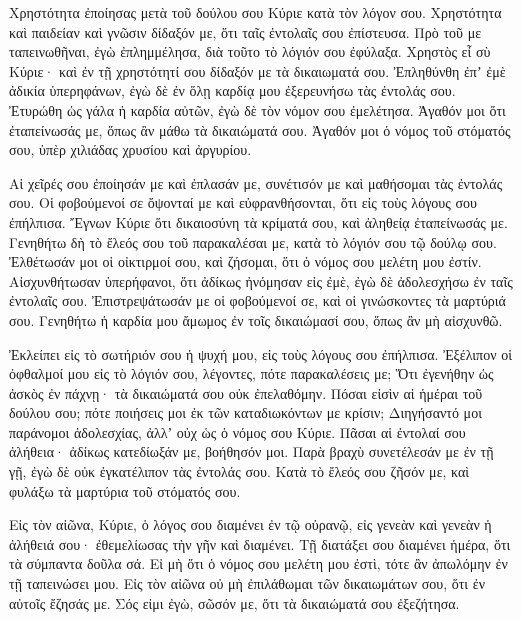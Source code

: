 {\par }{\PP {}Χρηστότητα ἐποίησας μετὰ τοῦ δούλου σου Κύριε κατὰ τὸν λόγον σου.
Χρηστότητα καὶ παιδείαν καὶ γνῶσιν δίδαξόν με, ὅτι ταῖς ἐντολαῖς σου ἐπίστευσα.
Πρὸ τοῦ με ταπεινωθῆναι, ἐγὼ ἐπλημμέλησα, διὰ τοῦτο τὸ λόγιόν σου ἐφύλαξα.
Χρηστὸς εἶ σὺ Κύριε· καὶ ἐν τῇ χρηστότητί σου δίδαξόν με τὰ δικαιωματά σου.
Ἐπληθύνθη ἐπʼ ἐμὲ ἀδικία ὑπερηφάνων, ἐγὼ δὲ ἐν ὅλῃ καρδίᾳ μου ἐξερευνήσω τὰς ἐντολάς σου.
Ἐτυρώθη ὡς γάλα ἡ καρδία αὐτῶν, ἐγὼ δὲ τὸν νόμον σου ἐμελέτησα.
Ἀγαθόν μοι ὅτι ἐταπείνωσάς με, ὅπως ἂν μάθω τὰ δικαιώματά σου.
Ἀγαθόν μοι ὁ νόμος τοῦ στόματός σου, ὑπὲρ χιλιάδας χρυσίου καὶ ἀργυρίου.
\par }{\PP {}Αἱ χεῖρές σου ἐποίησάν με καὶ ἐπλασάν με, συνέτισόν με καὶ μαθήσομαι τὰς ἐντολάς σου.
Οἱ φοβούμενοί σε ὄψονταί με καὶ εὐφρανθήσονται, ὅτι εἰς τοὺς λόγους σου ἐπήλπισα.
Ἔγνων Κύριε ὅτι δικαιοσύνη τὰ κρίματά σου, καὶ ἀληθείᾳ ἐταπείνωσάς με.
Γενηθήτω δὴ τὸ ἔλεός σου τοῦ παρακαλέσαι με, κατὰ τὸ λόγιόν σου τῷ δούλῳ σου.
Ἐλθέτωσάν μοι οἱ οἰκτιρμοί σου, καὶ ζήσομαι, ὅτι ὁ νόμος σου μελέτη μου ἐστίν.
Αἰσχυνθήτωσαν ὑπερήφανοι, ὅτι ἀδίκως ἠνόμησαν εἰς ἐμὲ, ἐγὼ δὲ ἀδολεσχήσω ἐν ταῖς ἐντολαῖς σου.
Ἐπιστρεψάτωσάν με οἱ φοβούμενοί σε, καὶ οἱ γινώσκοντες τὰ μαρτύριά σου.
Γενηθήτω ἡ καρδία μου ἄμωμος ἐν τοῖς δικαιώμασί σου, ὅπως ἂν μὴ αἰσχυνθῶ.
\par }{\PP {}Ἐκλείπει εἰς τὸ σωτήριόν σου ἡ ψυχή μου, εἰς τοὺς λόγους σου ἐπήλπισα.
Ἐξέλιπον οἱ ὀφθαλμοί μου εἰς τὸ λόγιόν σου, λέγοντες, πότε παρακαλέσεις με;
Ὅτι ἐγενήθην ὡς ἀσκὸς ἐν πάχνῃ· τὰ δικαιώματά σου οὐκ ἐπελαθόμην.
Πόσαι εἰσὶν αἱ ἡμέραι τοῦ δούλου σου; πότε ποιήσεις μοι ἐκ τῶν καταδιωκόντων με κρίσιν;
Διηγήσαντό μοι παράνομοι ἀδολεσχίας, ἀλλʼ οὐχ ὡς ὁ νόμος σου Κύριε.
Πᾶσαι αἱ ἐντολαί σου ἀλήθεια· ἀδίκως κατεδίωξάν με, βοήθησόν μοι.
Παρὰ βραχὺ συνετέλεσάν με ἐν τῇ γῇ, ἐγὼ δὲ οὐκ ἐγκατέλιπον τὰς ἐντολάς σου.
Κατὰ τὸ ἔλεός σου ζῆσόν με, καὶ φυλάξω τὰ μαρτύρια τοῦ στόματός σου.
\par }{\PP {}Εἰς τὸν αἰῶνα, Κύριε, ὁ λόγος σου διαμένει ἐν τῷ οὐρανῷ,
εἰς γενεὰν καὶ γενεὰν ἡ ἀλήθειά σου· ἐθεμελίωσας τὴν γῆν καὶ διαμένει.
Τῇ διατάξει σου διαμένει ἡμέρα, ὅτι τὰ σύμπαντα δοῦλα σά.
Εἰ μὴ ὅτι ὁ νόμος σου μελέτη μου ἐστὶ, τότε ἂν ἀπωλόμην ἐν τῇ ταπεινώσει μου.
Εἰς τὸν αἰῶνα οὐ μὴ ἐπιλάθωμαι τῶν δικαιωμάτων σου, ὅτι ἐν αὐτοῖς ἔζησάς με.
Σός εἰμι ἐγὼ, σῶσόν με, ὅτι τὰ δικαιώματά σου ἐξεζήτησα.
}
